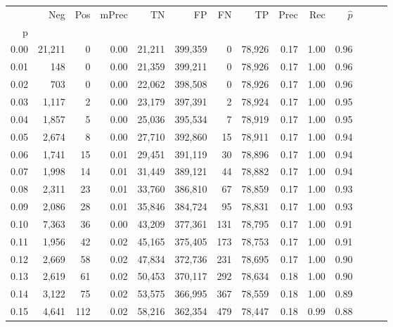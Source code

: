 \begin{tabular}{rrrrrrrrrrrrrr}
\toprule
{} &     Neg &    Pos & mPrec &       TN &       FP &      FN &      TP &  Prec &   Rec & $\hat{p}$ \\
p    &         &        &       &          &          &         &         &       &       &           \\
\midrule
0.00 &  21,211 &      0 &  0.00 &   21,211 &  399,359 &       0 &  78,926 &  0.17 &  1.00 &      0.96 \\
0.01 &     148 &      0 &  0.00 &   21,359 &  399,211 &       0 &  78,926 &  0.17 &  1.00 &      0.96 \\
0.02 &     703 &      0 &  0.00 &   22,062 &  398,508 &       0 &  78,926 &  0.17 &  1.00 &      0.96 \\
0.03 &   1,117 &      2 &  0.00 &   23,179 &  397,391 &       2 &  78,924 &  0.17 &  1.00 &      0.95 \\
0.04 &   1,857 &      5 &  0.00 &   25,036 &  395,534 &       7 &  78,919 &  0.17 &  1.00 &      0.95 \\
0.05 &   2,674 &      8 &  0.00 &   27,710 &  392,860 &      15 &  78,911 &  0.17 &  1.00 &      0.94 \\
0.06 &   1,741 &     15 &  0.01 &   29,451 &  391,119 &      30 &  78,896 &  0.17 &  1.00 &      0.94 \\
0.07 &   1,998 &     14 &  0.01 &   31,449 &  389,121 &      44 &  78,882 &  0.17 &  1.00 &      0.94 \\
0.08 &   2,311 &     23 &  0.01 &   33,760 &  386,810 &      67 &  78,859 &  0.17 &  1.00 &      0.93 \\
0.09 &   2,086 &     28 &  0.01 &   35,846 &  384,724 &      95 &  78,831 &  0.17 &  1.00 &      0.93 \\
0.10 &   7,363 &     36 &  0.00 &   43,209 &  377,361 &     131 &  78,795 &  0.17 &  1.00 &      0.91 \\
0.11 &   1,956 &     42 &  0.02 &   45,165 &  375,405 &     173 &  78,753 &  0.17 &  1.00 &      0.91 \\
0.12 &   2,669 &     58 &  0.02 &   47,834 &  372,736 &     231 &  78,695 &  0.17 &  1.00 &      0.90 \\
0.13 &   2,619 &     61 &  0.02 &   50,453 &  370,117 &     292 &  78,634 &  0.18 &  1.00 &      0.90 \\
0.14 &   3,122 &     75 &  0.02 &   53,575 &  366,995 &     367 &  78,559 &  0.18 &  1.00 &      0.89 \\
0.15 &   4,641 &    112 &  0.02 &   58,216 &  362,354 &     479 &  78,447 &  0.18 &  0.99 &      0.88 \\

\end{tabular}
